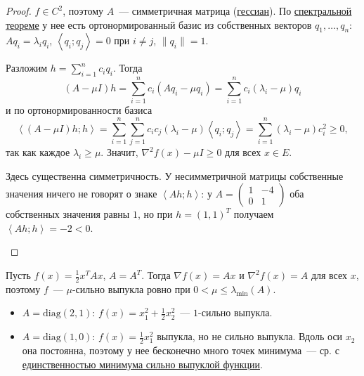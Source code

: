 \begin{proof}
  $f \in C^2$, поэтому $A$~--- симметричная матрица (\hyperref[note:592AD816-1D80-48E6-8399-8524FBC1E8F3]{гессиан}). По \hyperref[note:3BE0BBCE-AAB0-4CB4-8FA6-45277C0889CF]{спектральной теореме} у нее есть ортонормированный базис из собственных векторов $q_1, \dots, q_n$:
  $A q_i = \lambda_i q_i$, $\left\langle q_i; q_j \right\rangle = 0$ при $i \ne j$, $\| q_i \| = 1$.

  Разложим $h = \sum\limits_{i=1}^n c_i q_i$. Тогда
  \[
  (A - \mu I) h = \sum\limits_{i=1}^n c_i (A q_i - \mu q_i) = \sum\limits_{i=1}^n c_i (\lambda_i - \mu) q_i
  \]
  и по ортонормированности базиса
  \[
  \left\langle (A - \mu I)h; h \right\rangle = \sum\limits_{i=1}^n \sum\limits_{j=1}^n c_i c_j (\lambda_i - \mu) \left\langle q_i; q_j \right\rangle = \sum\limits_{i=1}^n (\lambda_i - \mu) c_i^2 \ge 0,
  \]
  так как каждое $\lambda_i \ge \mu$. Значит, $\nabla^2 f(x) - \mu I \ge 0$ для всех $x \in E$.

  \begin{remark}
    Здесь существенна симметричность. У несимметричной матрицы собственные значения ничего не говорят о знаке $\left\langle Ah; h \right\rangle$: у $A = \begin{pmatrix} 1 & -4 \\ 0 & 1 \end{pmatrix}$ оба собственных значения равны $1$, но при $h = (1, 1)^T$ получаем $\left\langle Ah; h \right\rangle = -2 < 0$.
  \end{remark}
\end{proof}

\begin{example}
  Пусть $f(x) = \frac{1}{2} x^T A x$, $A = A^T$. Тогда $\nabla f(x) = Ax$ и $\nabla^2 f(x) = A$ для всех $x$, поэтому $f$~--- $\mu$-сильно выпукла ровно при $0 < \mu \le \lambda_{\mathrm{min}}(A)$.

  \begin{itemize}
    \item $A = \mathrm{diag}(2, 1)$: $f(x) = x_1^2 + \frac{1}{2} x_2^2$~--- $1$-сильно выпукла.
    \item $A = \mathrm{diag}(1, 0)$: $f(x) = \frac{1}{2} x_1^2$ выпукла, но не сильно выпукла. Вдоль оси $x_2$ она постоянна, поэтому у нее бесконечно много точек минимума~--- ср. с \hyperref[note:51CC880D-BF19-43E2-9599-FB31A9A7367F]{единственностью минимума сильно выпуклой функции}.
  \end{itemize}
\end{example}
